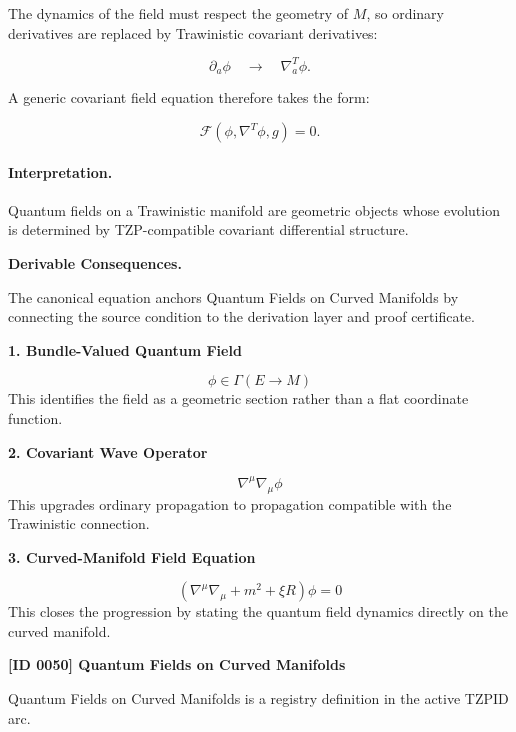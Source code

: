 The dynamics of the field must respect the geometry of $M$, so ordinary derivatives are replaced by Trawinistic covariant derivatives:

\begin{equation}
\partial_a\phi
\quad\longrightarrow\quad
\nabla^T_a\phi .
\end{equation}

A generic covariant field equation therefore takes the form:

\begin{equation}
\mathcal{F}
\left(
\phi,\nabla^T\phi,g
\right)
=
0 .
\end{equation}

\paragraph{Interpretation.}
Quantum fields on a Trawinistic manifold are geometric objects whose evolution is determined by TZP-compatible covariant differential structure.

\par\vspace{0.35em}
\noindent\textbf{Derivable Consequences.}\quad
\begingroup
\footnotesize
\raggedright
The canonical equation anchors Quantum Fields on Curved Manifolds by connecting the source condition to the derivation layer and proof certificate.
\par\endgroup

\noindent\textbf{1. Bundle-Valued Quantum Field}\par
\[
\phi \in \Gamma(E \to M)
\]
\noindent This identifies the field as a geometric section rather than a flat coordinate function.\par
\noindent\textbf{2. Covariant Wave Operator}\par
\[
\nabla^{\mu}\nabla_{\mu}\phi
\]
\noindent This upgrades ordinary propagation to propagation compatible with the Trawinistic connection.\par
\noindent\textbf{3. Curved-Manifold Field Equation}\par
\[
\left(\nabla^{\mu}\nabla_{\mu} + m^{2} + \xi R\right)\phi = 0
\]
\noindent This closes the progression by stating the quantum field dynamics directly on the curved manifold.\par

\clearpage
\noindent\textbf{[ID 0050] Quantum Fields on Curved Manifolds}\par
\vspace{0.35em}
\begingroup\small
{}
Quantum Fields on Curved Manifolds is a registry definition in the active TZPID arc.

